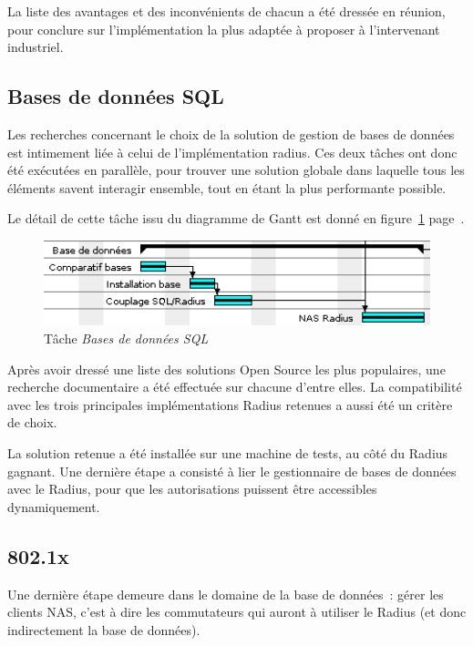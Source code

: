 La liste des avantages et des inconvénients de chacun a été dressée en réunion, pour conclure sur l'implémentation la plus adaptée à proposer à l'intervenant industriel.

\subsection{Bases de données SQL}

Les recherches concernant le choix de la solution de gestion de bases de données est intimement liée à celui de l'implémentation radius. Ces deux tâches ont donc été exécutées en parallèle, pour trouver une solution globale dans laquelle tous les éléments savent interagir ensemble, tout en étant la plus performante possible.

Le détail de cette tâche issu du diagramme de Gantt est donné en figure~\ref{gantt_sql} page~\pageref{gantt_sql}.

\begin{figure}[!h]
	\begin{center}
		\includegraphics[width=350pt]{img/gantt_sql.png}
	\end{center}
	\caption{Tâche \textit{Bases de données SQL}}
	\label{gantt_sql}
\end{figure}

Après avoir dressé une liste des solutions Open Source les plus populaires, une recherche documentaire a été effectuée sur chacune d'entre elles. La compatibilité avec les trois principales implémentations Radius retenues a aussi été un critère de choix.

La solution retenue a été installée sur une machine de tests, au côté du Radius gagnant. Une dernière étape a consisté à lier le gestionnaire de bases de données avec le Radius, pour que les autorisations puissent être accessibles dynamiquement.

\subsection{802.1x}

Une dernière étape demeure dans le domaine de la base de données~: gérer les clients NAS, c'est à dire les commutateurs qui auront à utiliser le Radius (et donc indirectement la base de données).


